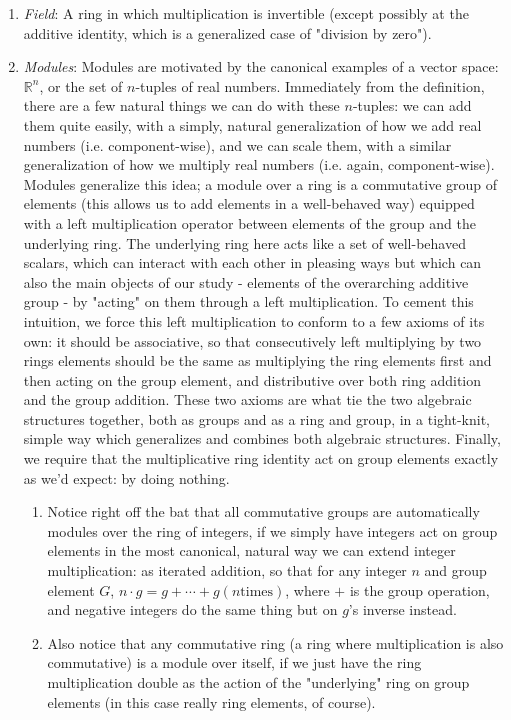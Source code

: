 \documentclass{article}
\newcommand{\R}{\mathbb{R}}
\begin{document}
\begin{enumerate}
    \item \textit{Field}: A ring in which multiplication is invertible (except possibly at the additive identity, which is a generalized case of "division by zero").
    \item \textit{Modules}: Modules are motivated by the canonical examples of a vector space: $ \R^n $, or the set of $ n $-tuples of real numbers. Immediately from the definition, there are a few natural things we can do with these $ n $-tuples: we can add them quite easily, with a simply, natural generalization of how we add real numbers (i.e. component-wise), and we can scale them, with a similar generalization of how we multiply real numbers (i.e. again, component-wise). Modules generalize this idea; a module over a ring is a commutative group of elements (this allows us to add elements in a well-behaved way) equipped with a left multiplication operator between elements of the group and the underlying ring. The underlying ring here acts like a set of well-behaved scalars, which can interact with each other in pleasing ways but which can also the main objects of our study - elements of the overarching additive group - by "acting" on them through a left multiplication. To cement this intuition, we force this left multiplication to conform to a few axioms of its own: it should be associative, so that consecutively left multiplying by two rings elements should be the same as multiplying the ring elements first and then acting on the group element, and distributive over both ring addition and the group addition. These two axioms are what tie the two algebraic structures together, both as groups and as a ring and group, in a tight-knit, simple way which generalizes and combines both algebraic structures. Finally, we require that the multiplicative ring identity act on group elements exactly as we'd expect: by doing nothing.
    \begin{enumerate}
        \item Notice right off the bat that all commutative groups are automatically modules over the ring of integers, if we simply have integers act on group elements in the most canonical, natural way we can extend integer multiplication: as iterated addition, so that for any integer $ n $ and group element $ G $, $ n \cdot g = g + \cdots + g (n \text{times}) $, where $ + $ is the group operation, and negative integers do the same thing but on $ g $'s inverse instead.
        \item Also notice that any commutative ring (a ring where multiplication is also commutative) is a module over itself, if we just have the ring multiplication double as the action of the "underlying" ring on group elements (in this case really ring elements, of course).
    \end{enumerate}
\end{enumerate}
\end{document}

